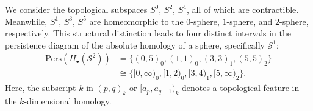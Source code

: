 \begin{example}{\cite[\S 2.3, Example]{de2011dualities}}
    We consider the topological subspaces $S^{0}$,
    $S^{2}$, $S^{4}$, all of which are contractible. Meanwhile,
    $S^{1}$, $S^{3}$, $S^{5}$ are homeomorphic to the $0$-sphere, $1$-sphere, and $2$-sphere,
    respectively. This structural distinction leads to four distinct intervals in
    the persistence diagram of the absolute homology of a sphere, specifically $\mathcal{S}^{1}$:
    \begin{align}
        \mathrm{Pers}(H_{\bullet}(\mathcal{S}^{2})) & = \{(0,5)_{0}, (1,1)_{0}, (3,3)_{1}, (5,5)_{2} \}             \nonumber\\
                                                    & \cong \{[0,\infty)_{0}, [1,2)_{0}, [3,4)_{1}, [5, \infty)_{2} \}.
    \end{align}
    Here, the subscript $k$ in $(p,q)_{k}$ or $[a_{p}, a_{q+1})_{k}$ denotes a topological
    feature in the $k$-dimensional homology.
\end{example}

